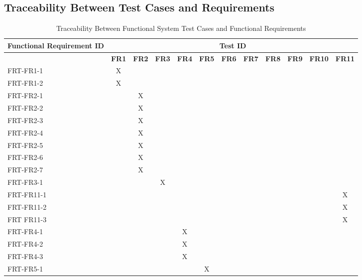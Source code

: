 \documentclass[12pt, titlepage]{article}
\begin{document}
\newpage
\begin{landscape}
  \subsection{Traceability Between Test Cases and Requirements}

  \begin{longtable}{|l|ccccccccccc|}
		\caption{Traceability Between Functional System Test Cases and Functional Requirements} \\
		\hline
    \textbf{Functional Requirement ID}   & \multicolumn{11}{c|}{\textbf{Test ID}} \\
    \hline
    ~ & \textbf{FR1} & \textbf{FR2} & \textbf{FR3} & \textbf{FR4} & \textbf{FR5} & \textbf{FR6} & \textbf{FR7} & \textbf{FR8} & \textbf{FR9} & \textbf{FR10} & \textbf{FR11} \\
    \hline
    FRT-FR1-1 & X & ~ & ~ & ~ & ~ & ~ & ~ & ~ & ~ & ~ & ~ \\
    FRT-FR1-2 & X & ~ & ~ & ~ & ~ & ~ & ~ & ~ & ~ & ~ & ~ \\
    FRT-FR2-1 & ~ & X & ~ & ~ & ~ & ~ & ~ & ~ & ~ & ~ & ~ \\
    FRT-FR2-2 & ~ & X & ~ & ~ & ~ & ~ & ~ & ~ & ~ & ~ & ~ \\
    FRT-FR2-3 & ~ & X & ~ & ~ & ~ & ~ & ~ & ~ & ~ & ~ & ~ \\
    FRT-FR2-4 & ~ & X & ~ & ~ & ~ & ~ & ~ & ~ & ~ & ~ & ~ \\
    FRT-FR2-5 & ~ & X & ~ & ~ & ~ & ~ & ~ & ~ & ~ & ~ & ~ \\
    FRT-FR2-6 & ~ & X & ~ & ~ & ~ & ~ & ~ & ~ & ~ & ~ & ~ \\
    FRT-FR2-7 & ~ & X & ~ & ~ & ~ & ~ & ~ & ~ & ~ & ~ & ~ \\
    FRT-FR3-1 & ~ & ~ & X & ~ & ~ & ~ & ~ & ~ & ~ & ~ & ~ \\
    FRT-FR11-1 & ~ & ~ & ~ & ~ & ~ & ~ & ~ & ~ & ~ & ~ & X \\
    FRT-FR11-2 & ~ & ~ & ~ & ~ & ~ & ~ & ~ & ~ & ~ & ~ & X \\
    FRT FR11-3 & ~ & ~ & ~ & ~ & ~ & ~ & ~ & ~ & ~ & ~ & X \\
    FRT-FR4-1 & ~ & ~ & ~ & X & ~ & ~ & ~ & ~ & ~ & ~ & ~ \\
    FRT-FR4-2 & ~ & ~ & ~ & X & ~ & ~ & ~ & ~ & ~ & ~ & ~ \\
    FRT-FR4-3 & ~ & ~ & ~ & X & ~ & ~ & ~ & ~ & ~ & ~ & ~ \\
    FRT-FR5-1 & ~ & ~ & ~ & ~ & X & ~ & ~ & ~ & ~ & ~ & ~ \\

\end{longtable}
\end{landscape}
\end{document}
